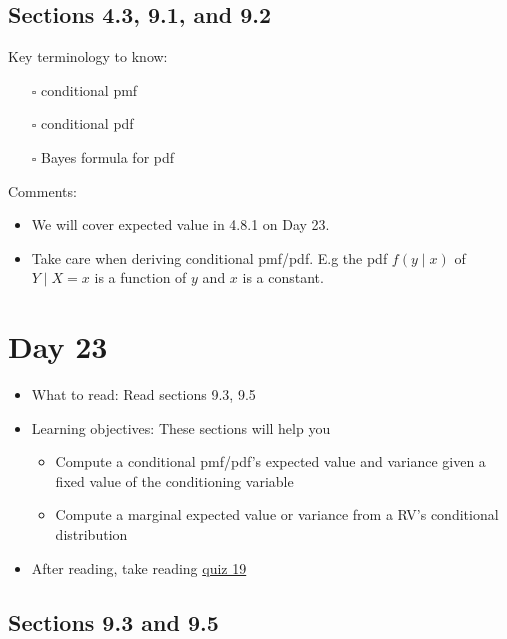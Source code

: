 \documentclass[
  letterpaper,
]{scrbook}
\providecommand{\tightlist}{%
  \setlength{\itemsep}{0pt}\setlength{\parskip}{0pt}}\usepackage{longtable,booktabs,array}
\begin{document}
\subsection*{Sections 4.3, 9.1, and 9.2}\label{sections-4.3-9.1-and-9.2}

Key terminology to know:

\begin{itemize}
\tightlist
\item[$\square$]
  conditional pmf
\item[$\square$]
  conditional pdf
\item[$\square$]
  Bayes formula for pdf
\end{itemize}

Comments:

\begin{itemize}
\tightlist
\item
  We will cover expected value in 4.8.1 on Day 23.
\item
  Take care when deriving conditional pmf/pdf. E.g the pdf
  \(f(y \mid x)\) of \(Y \mid X=x\) is a function of \(y\) and \(x\) is
  a constant.
\end{itemize}

\section*{Day 23}\label{day-23}


\begin{itemize}
\item
  What to read: Read sections 9.3, 9.5
\item
  Learning objectives: These sections will help you

  \begin{itemize}
  \tightlist
  \item
    Compute a conditional pmf/pdf's expected value and variance given a
    fixed value of the conditioning variable
  \item
    Compute a marginal expected value or variance from a RV's
    conditional distribution
  \end{itemize}
\item
  After reading, take reading
  \href{https://forms.gle/AZmecHbJtKckUvkL6}{quiz 19}
\end{itemize}

\subsection*{Sections 9.3 and 9.5}\label{sections-9.3-and-9.5}
\end{document}
